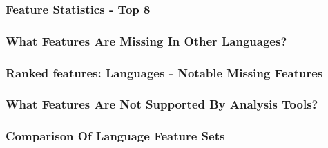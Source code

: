 \begin{frame}[fragile]
\frametitle{Feature Statistics - Top 8}

\end{frame}




\begin{frame}[fragile]
\frametitle{What Features Are Missing In Other Languages?}

\end{frame}


\begin{frame}[fragile]
\frametitle{Ranked features: Languages - Notable Missing Features}

\end{frame}



\begin{frame}
\frametitle{What Features Are Not Supported By Analysis Tools?}

\end{frame}



\begin{frame}[fragile]
\frametitle{Comparison Of Language Feature Sets}
\begin{columns}[t] %


\end{columns}


\end{frame}

